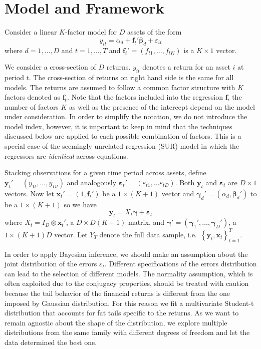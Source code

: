 \section{Model and Framework}
Consider a linear $K$-factor model for $D$ assets of the form
\begin{equation*}
y_{it}=\alpha _{d} + \mathbf{f}_{t}' \boldsymbol{\beta}_d + \varepsilon_{it}
\end{equation*}
where $d = 1, \hdots, D$ and $t = 1, \hdots, T$ and $\mathbf{f}_{t}'=\left(f_{t1}, \hdots,f_{tK}\right)$ is a $K\times1$ vector.

We consider a cross-section of $D$ returns.
$y_{it}$ denotes a return for an asset $i$ at period $t$. 
The cross-section of returns on right hand side is the same for all models. 
The returns are assumed to follow a common factor structure with $K$ factors denoted as $\mathbf{f}_{t}$. 
Note that the factors included into the regression $\mathbf{f}$, the number of factors $K$ as well as the presence of the intercept depend on the model under consideration.  
In order to simplify the notation, we do not introduce the model index, however, it is important to keep in mind that the techniques discussed below are applied to each possible combination of factors.
This is a special case of the seemingly unrelated regression (SUR) model in which the regressors are \emph{identical} across equations.

Stacking observations for a given time period across assets, define $\mathbf{y}_t' = (y_{1t}, \hdots, y_{Dt})$ and analogously $\boldsymbol{\varepsilon}_t' = \left( \varepsilon_{t1}, \hdots \varepsilon_{tD} \right)$. 
Both $\mathbf{y}_t$ and $\boldsymbol{\varepsilon}_t$ are $D \times 1$ vectors.
Now let $\mathbf{x}_t' = (1, \mathbf{f}_t')$ be a $1 \times (K+1)$ vector and $\boldsymbol{\gamma}_d' = (\alpha_d, \boldsymbol{\beta}_d')$ to be a $1 \times (K+1)$ so we have
\begin{equation*}
\mathbf{y}_t = X_t \boldsymbol{\gamma} + \boldsymbol{\varepsilon}_t
\end{equation*}
where $X_t = I_D \otimes \mathbf{x}_t'$, a $D \times D(K+1)$ matrix, and $\boldsymbol{\gamma}'= \left( \boldsymbol{\gamma}_1', \hdots, \boldsymbol{\gamma}_D' \right)$, a $1 \times (K+1)D$ vector. 
Let $Y_T$ denote the full data sample, i.e.\ $\left\{ \mathbf{y}_t, \mathbf{x}_t \right\}_{t=1}^T$.

In order to apply Bayesian inference, we should make an assumption about the joint distribution of the errors $\varepsilon_t$.  
Different specifications of the errors distribution can lead to the selection of different models. 
The normality assumption, which is often exploited due to the conjugacy properties, should be treated with caution because the tail behavior of the financial returns is different from the one imposed by Gaussian distribution.
For this reason we fit a multivariate Student-t distribution that accounts for fat tails specific to the returns. 
As we want to remain agnostic about the shape of the distribution, we explore multiple distributions from the same family with different degrees of freedom and let the data determined the best one.

